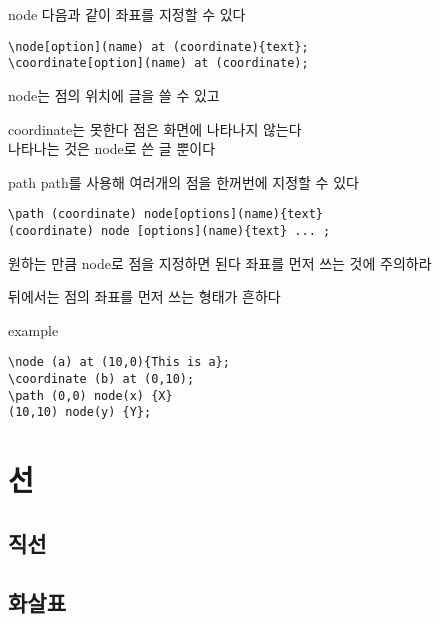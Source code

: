 \documentclass[12pt]{beamer}
\begin{document}
\begin{frame}[fragile]{\secname}{node}
	다음과 같이 좌표를 지정할 수 있다
	\begin{lstlisting}
\node[option](name) at (coordinate){text};
\coordinate[option](name) at (coordinate);
	\end{lstlisting}
	\vfill
	node는 점의 위치에 글을 쓸 수 있고 
	
	coordinate는 못한다
	\vfill
	점은 화면에 나타나지 않는다\\
	나타나는 것은 node로 쓴 글 뿐이다
\end{frame}

\begin{frame}[fragile]{\secname}{path}
	path를 사용해 여러개의 점을 한꺼번에 지정할 수 있다
	
	\begin{lstlisting}
\path (coordinate) node[options](name){text}
(coordinate) node [options](name){text} ... ;
	\end{lstlisting}
	
	원하는 만큼 node로 점을 지정하면 된다
	\vfill
	좌표를 먼저 쓰는 것에 주의하라
	
	뒤에서는 점의 좌표를 먼저 쓰는 형태가 흔하다

\end{frame}

\begin{frame}[fragile]{\secname}{example}
	\begin{lstlisting}
\node (a) at (10,0){This is a};
\coordinate (b) at (0,10);
\path (0,0) node(x) {X}
(10,10) node(y) {Y};
	\end{lstlisting}
	
\begin{center}
\end{center}

\end{frame}


\section{선}

\subsection{직선}
\subsection{화살표}
\end{document}
